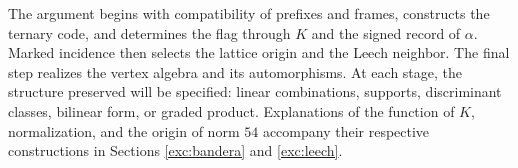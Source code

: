 The argument begins with compatibility of prefixes and frames,
constructs the ternary code, and determines the flag through \(K\) and the
signed record of \(\alpha\). Marked incidence then selects
the lattice origin and the Leech neighbor. The final step realizes the vertex
algebra and its automorphisms. At each stage, the structure
preserved will be specified: linear combinations, supports, discriminant classes, bilinear
form, or graded product. Explanations of the function of \(K\),
normalization, and the origin of norm \(54\) accompany their respective
constructions in Sections \ref{exc:bandera} and \ref{exc:leech}.

